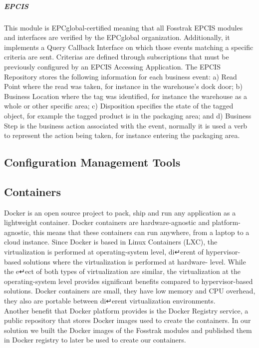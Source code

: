 \subparagraph{EPCIS}
This module is EPCglobal-certified meaning that all Fosstrak EPCIS modules and interfaces are
verified by the EPCglobal organization. Additionally, it implements a Query Callback Interface on which
those events matching a specific criteria are sent. Criterias are defined through subscriptions that
must be previously configured by an EPCIS Accessing Application. The EPCIS Repository stores the following
information for each business event: a) Read Point where the read was taken, for instance in the warehouse’s
dock door; b) Business Location where the tag was identified, for instance the warehouse as a whole or other
specific area; c) Disposition specifies the state of the tagged object, for example the tagged product is
in the packaging area; and d) Business Step is the business action associated with the event, normally it
is used a verb to represent the action being taken, for instance entering the packaging area.

\subsection{Configuration Management Tools}
\label{sub:cm_tools}


\subsection{Containers}
\label{sub:containers}
Docker is an open source project to pack, ship and run any application as a lightweight container.
Docker containers are hardware-agnostic and platform-agnostic, this means that these containers can
run anywhere, from a laptop to a cloud instance. Since Docker is based in Linux Containers (LXC),
the virtualization is performed at operating-system level, di↵erent of hypervisor-based solutions where
the virtualization is performed at hardware- level. While the e↵ect of both types of virtualization
are similar, the virtualization at the operating-system level provides significant benefits compared
to hypervisor-based solutions. Docker containers are small, they have low memory and CPU overhead,
they also are portable between di↵erent virtualization environments.\\

Another benefit that Docker platform provides is the Docker Registry service, a public repository
that stores Docker images used to create the containers. In our solution we built the Docker images
of the Fosstrak modules and published them in Docker registry to later be used to create our containers.
